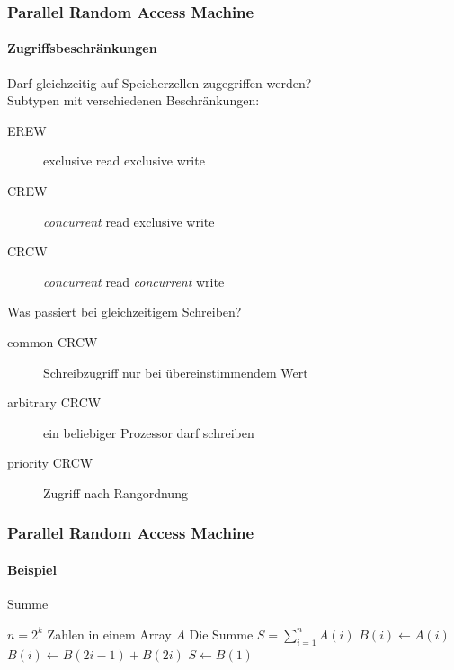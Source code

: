 \begin{frame}
    \frametitle{Parallel Random Access Machine}
    \framesubtitle{Zugriffsbeschränkungen}
    Darf gleichzeitig auf Speicherzellen zugegriffen werden? \\
    Subtypen mit verschiedenen Beschränkungen:
    \begin{description}
        \item[EREW] exclusive read exclusive write
        \item[CREW] \emph{concurrent} read exclusive write
        \item[CRCW] \emph{concurrent} read \emph{concurrent} write
    \end{description}
    \pause
    Was passiert bei gleichzeitigem Schreiben?
    \begin{description}
        \item[common CRCW] Schreibzugriff nur bei übereinstimmendem Wert
        \item[arbitrary CRCW] ein beliebiger Prozessor darf schreiben
        \item[priority CRCW] Zugriff nach Rangordnung
    \end{description}
\end{frame}

\begin{frame}
    \frametitle{Parallel Random Access Machine}
    \framesubtitle{Beispiel}
    \begin{algorithm}[H]
        \caption{Summe \cite[S.26]{jaja}}
        \label{alg:pram-sum}
        \begin{algorithmic}[1]
        \Require $n = 2^k$ Zahlen in einem Array $A$
        \Ensure Die Summe $S = \sum_{i=1}^n A(i)$
            \State $B(i) \gets A(i)$
        \EndParDo
                \State $B(i) \gets B(2i-1) + B(2i)$
            \EndParDo
        \EndFor
        \State $S \gets B(1)$
        \end{algorithmic}
    \end{algorithm}
\end{frame}
